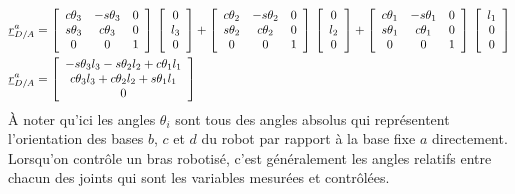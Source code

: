 \begin{align}
	\underline{r}_{D/A}^a &= \left[ \begin{array}{c c c}
								  c\theta_3 & -s\theta_3 & 0 \\
								  s\theta_3 & c\theta_3 & 0 \\
								  0 & 0 & 1
	\end{array}  \right] \, \left[ \begin{array}{c}
									   0 \\ l_3 \\ 0
	\end{array} \right] + \left[ \begin{array}{c c c}
									 c\theta_2 & -s\theta_2 & 0 \\
									 s\theta_2 & c\theta_2 & 0 \\
									 0 & 0 & 1
	\end{array}  \right] \, \left[ \begin{array}{c}
									   0 \\ l_2 \\ 0
	\end{array} \right]  + \left[ \begin{array}{c c c}
									  c\theta_1 & -s\theta_1 & 0 \\
									  s\theta_1 & c\theta_1 & 0 \\
									  0 & 0 & 1
	\end{array}  \right] \, \left[ \begin{array}{c}
									   l_1 \\ 0 \\ 0
	\end{array} \right] \\
	\underline{r}_{D/A}^a &= \left[ \begin{array}{c}
								  -s\theta_3 l_3 - s\theta_2 l_2  + c\theta_1 l_1 \\
								  c\theta_3 l_3 + c\theta_2 l_2  + s\theta_1 l_1  \\
								  0
	\end{array} \right]
	\label{eq:robot2dpos}
\end{align}
À noter qu’ici les angles $\theta_i$ sont tous des angles absolus qui représentent l'orientation des bases $b$, $c$ et $d$ du robot par rapport à la base fixe $a$ directement. Lorsqu'on contrôle un bras robotisé, c'est généralement les angles relatifs entre chacun des joints qui sont les variables mesurées et contrôlées.




